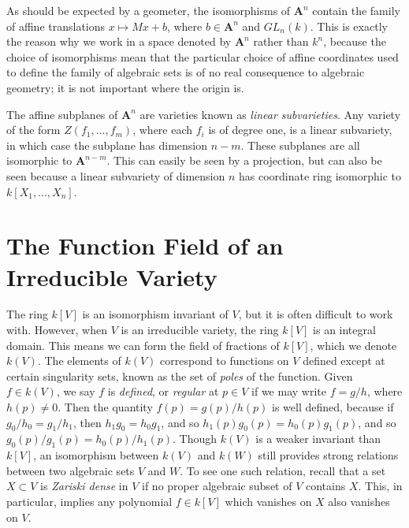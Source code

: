As should be expected by a geometer, the isomorphisms of $\mathbf{A}^n$ contain the family of affine translations $x \mapsto Mx + b$, where $b \in \mathbf{A}^n$ and $GL_n(k)$. This is exactly the reason why we work in a space denoted by $\mathbf{A}^n$ rather than $k^n$, because the choice of isomorphisms mean that the particular choice of affine coordinates used to define the family of algebraic sets is of no real consequence to algebraic geometry; it is not important where the origin is.

\begin{example}
    The affine subplanes of $\mathbf{A}^n$ are varieties known as \emph{linear subvarieties}. Any variety of the form $Z(f_1, \dots, f_m)$, where each $f_i$ is of degree one, is a linear subvariety, in which case the subplane has dimension $n-m$. These subplanes are all isomorphic to $\mathbf{A}^{n-m}$. This can easily be seen by a projection, but can also be seen because a linear subvariety of dimension $n$ has coordinate ring isomorphic to $k[X_1, \dots, X_n]$.
\end{example}

\section{The Function Field of an Irreducible Variety}

The ring $k[V]$ is an isomorphism invariant of $V$, but it is often difficult to work with. However, when $V$ is an irreducible variety, the ring $k[V]$ is an integral domain. This means we can form the field of fractions of $k[V]$, which we denote $k(V)$. The elements of $k(V)$ correspond to functions on $V$ defined except at certain singularity sets, known as the set of \emph{poles} of the function. Given $f \in k(V)$, we say $f$ is \emph{defined}, or \emph{regular} at $p \in V$ if we may write $f = g/h$, where $h(p) \neq 0$. Then the quantity $f(p) = g(p)/h(p)$ is well defined, because if $g_0/h_0 = g_1/h_1$, then $h_1g_0 = h_0g_1$, and so $h_1(p) g_0(p) = h_0(p) g_1(p)$, and so $g_0(p)/g_1(p) = h_0(p)/h_1(p)$. Though $k(V)$ is a weaker invariant than $k[V]$, an isomorphism between $k(V)$ and $k(W)$ still provides strong relations between two algebraic sets $V$ and $W$. To see one such relation, recall that a set $X \subset V$ is \emph{Zariski dense} in $V$ if no proper algebraic subset of $V$ contains $X$. This, in particular, implies any polynomial $f \in k[V]$ which vanishes on $X$ also vanishes on $V$.

